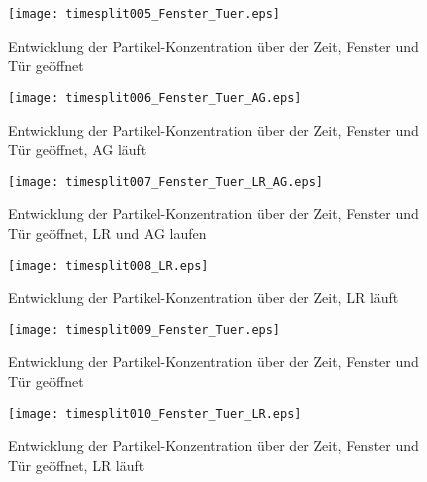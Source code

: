\documentclass[12pt,a4paper,bibtotocnumbered,liststotocnumbered]{scrreprt}
\begin{document}
\begin{figure}[H]
\begin{minipage}[t]{0.49\textwidth}
\texttt{[image: timesplit005\_Fenster\_Tuer.eps]}
\caption{Entwicklung der Partikel-Konzentration über der Zeit, Fenster und Tür geöffnet}
\label{Abb: timesplit005_Fenster_Tuer}
\end{minipage}
\begin{minipage}[t]{0.49\textwidth}
\texttt{[image: timesplit006\_Fenster\_Tuer\_AG.eps]}
\caption{Entwicklung der Partikel-Konzentration über der Zeit, Fenster und Tür geöffnet, AG läuft}
\label{Abb: timesplit006_Fenster_Tuer_AG}
\end{minipage}
\begin{minipage}[t]{0.49\textwidth}
\texttt{[image: timesplit007\_Fenster\_Tuer\_LR\_AG.eps]}
\caption{Entwicklung der Partikel-Konzentration über der Zeit,  Fenster und Tür geöffnet, LR und AG laufen}
\label{Abb: timesplit007_Fenster_Tuer_LR_AG}
\end{minipage}
\begin{minipage}[t]{0.49\textwidth}
\texttt{[image: timesplit008\_LR.eps]}
\caption{Entwicklung der Partikel-Konzentration über der Zeit, LR läuft}
\label{Abb: timesplit008_LR}
\end{minipage}
\end{figure}

\begin{figure}[H]
\begin{minipage}[t]{0.49\textwidth}
\texttt{[image: timesplit009\_Fenster\_Tuer.eps]}
\caption{Entwicklung der Partikel-Konzentration über der Zeit, Fenster und Tür geöffnet}
\label{Abb: timesplit009_Fenster_Tuer}
\end{minipage}
\begin{minipage}[t]{0.49\textwidth}
\texttt{[image: timesplit010\_Fenster\_Tuer\_LR.eps]}
\caption{Entwicklung der Partikel-Konzentration über der Zeit, Fenster und Tür geöffnet, LR läuft}
\label{Abb: timesplit010_Fenster_Tuer_LR}
\end{minipage}
\end{figure}
\end{document}
